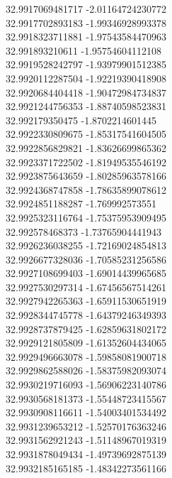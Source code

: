 {32.9917069481717	-2.01164724230772\\
32.9917702893183	-1.99346928993378\\
32.9918323711881	-1.97543584470963\\
32.991893210611	-1.95754604112108\\
32.9919528242797	-1.93979901512385\\
32.9920112287504	-1.92219390418908\\
32.9920684404418	-1.90472984734837\\
32.9921244756353	-1.88740598523831\\
32.992179350475	-1.8702214601445\\
32.9922330809675	-1.85317541604505\\
32.9922856829821	-1.83626699865362\\
32.9923371722502	-1.81949535546192\\
32.9923875643659	-1.80285963578166\\
32.9924368747858	-1.78635899078612\\
32.9924851188287	-1.769992573551\\
32.9925323116764	-1.75375953909495\\
32.992578468373	-1.73765904441943\\
32.9926236038255	-1.72169024854813\\
32.9926677328036	-1.70585231256586\\
32.9927108699403	-1.69014439965685\\
32.9927530297314	-1.67456567514261\\
32.9927942265363	-1.65911530651919\\
32.9928344745778	-1.64379246349393\\
32.9928737879425	-1.62859631802172\\
32.9929121805809	-1.61352604434065\\
32.9929496663078	-1.59858081900718\\
32.9929862588026	-1.58375982093074\\
32.9930219716093	-1.56906223140786\\
32.9930568181373	-1.55448723415567\\
32.9930908116611	-1.54003401534492\\
32.9931239653212	-1.52570176363246\\
32.9931562921243	-1.51148967019319\\
32.9931878049434	-1.49739692875139\\
32.9932185165185	-1.48342273561166\\
}
